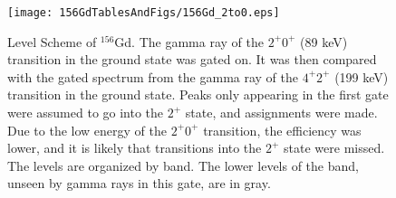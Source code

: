 \begin{figure}
    \centering
    \texttt{[image: 156GdTablesAndFigs/156Gd\_2to0.eps]}
    \caption{Level Scheme of $^{156}$Gd. The gamma ray of the $2^+$\rightarrow$0^+$ (89 keV) transition in the ground state was gated on. It was then compared with the gated spectrum from the gamma ray of the $4^+$\rightarrow$2^+$ (199 keV) transition in the ground state. Peaks only appearing in the first gate were assumed to go into the $2^+$ state, and assignments were made. Due to the low energy of the $2^+$\rightarrow$0^+$ transition, the efficiency was lower, and it is likely that transitions into the $2^+$ state were missed. The levels are organized by band. The lower levels of the band, unseen by gamma rays in this gate, are in gray.}
    \label{fig:156_2to0}
\end{figure}